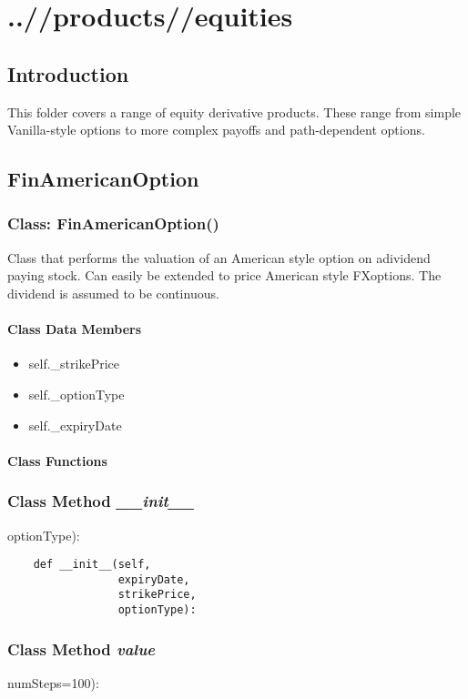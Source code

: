 \documentclass[twoside,11pt]{book}
\begin{document}
\chapter{..//products//equities}
\section{Introduction}
This folder covers a range of equity derivative products. These range from simple Vanilla-style options to more complex payoffs and path-dependent options. 
\newpage
\section{FinAmericanOption}

\subsection{Class: FinAmericanOption()}
Class that performs the valuation of an American style option on adividend paying stock. Can easily be extended to price American style FXoptions. The dividend is assumed to be continuous. 

\subsubsection{Class Data Members}
\begin{itemize}
\item{self.\_strikePrice}
\item{self.\_optionType}
\item{self.\_expiryDate}
\end{itemize}

\subsubsection{Class Functions}

\subsection{Class Method {\it \_\_init\_\_}}
optionType):

\begin{lstlisting}
    def __init__(self,
                 expiryDate,
                 strikePrice,
                 optionType):
\end{lstlisting}

\subsection{Class Method {\it value}}
numSteps=100):
\end{document}
